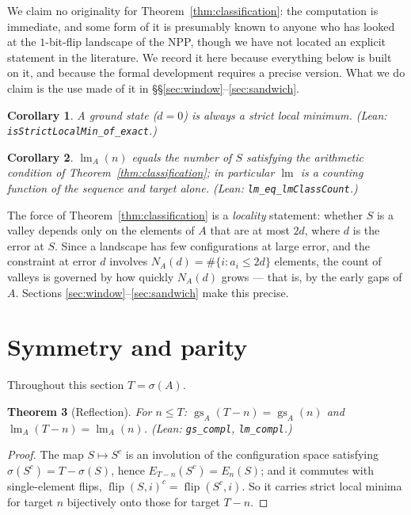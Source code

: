 \documentclass[11pt,a4paper]{article}
\theoremstyle{plain}
\newtheorem{theorem}{Theorem}[section]
\newtheorem{corollary}[theorem]{Corollary}
\theoremstyle{definition}
\theoremstyle{remark}
\DeclareMathOperator{\lm}{lm}
\DeclareMathOperator{\gs}{gs}
\newcommand{\Lean}[1]{\texttt{#1}}
\begin{document}
We claim no originality for Theorem~\ref{thm:classification}: the computation is
immediate, and some form of it is presumably known to anyone who has looked at
the $1$-bit-flip landscape of the NPP, though we have not located an explicit
statement in the literature. We record it here because everything below is built
on it, and because the formal development requires a precise version. What we do
claim is the use made of it in \S\S\ref{sec:window}--\ref{sec:sandwich}.

\begin{corollary}\label{cor:ground-is-min}
A ground state ($d=0$) is always a strict local minimum.
\textup{(Lean: \Lean{isStrictLocalMin\_of\_exact}.)}
\end{corollary}

\begin{corollary}\label{cor:lm-arithmetic}
$\lm_A(n)$ equals the number of $S$ satisfying the arithmetic condition of
Theorem~\ref{thm:classification}; in particular $\lm$ is a counting function of
the sequence and target alone.
\textup{(Lean: \Lean{lm\_eq\_lmClassCount}.)}
\end{corollary}

The force of Theorem~\ref{thm:classification} is a \emph{locality} statement:
whether $S$ is a valley depends only on the elements of $A$ that are at most
$2d$, where $d$ is the error at $S$. Since a landscape has few configurations at
large error, and the constraint at error $d$ involves
$N_A(d)=\#\{i:a_i\le2d\}$ elements, the count of valleys is governed by how
quickly $N_A(d)$ grows --- that is, by the early gaps of $A$. Sections
\ref{sec:window}--\ref{sec:sandwich} make this precise.

\section{Symmetry and parity}\label{sec:symmetry}

Throughout this section $T=\sigma(A)$.

\begin{theorem}[Reflection]\label{thm:reflection}
For $n\le T$: $\gs_A(T-n)=\gs_A(n)$ and $\lm_A(T-n)=\lm_A(n)$.
\textup{(Lean: \Lean{gs\_compl}, \Lean{lm\_compl}.)}
\end{theorem}

\begin{proof}
The map $S\mapsto S^{c}$ is an involution of the configuration space satisfying
$\sigma(S^{c})=T-\sigma(S)$, hence $E_{T-n}(S^{c})=E_n(S)$; and it commutes with
single-element flips, $\operatorname{flip}(S,i)^{c}=\operatorname{flip}(S^{c},i)$.
So it carries strict local minima for target $n$ bijectively onto those for
target $T-n$.
\end{proof}
\end{document}
